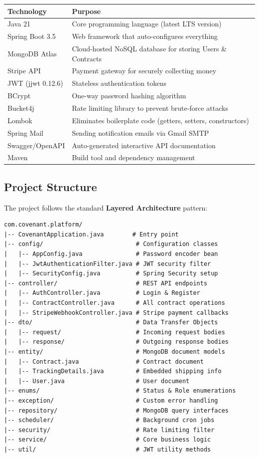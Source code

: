 \documentclass[11pt, a4paper]{article}
\begin{document}
\begin{longtable}{@{}lp{10cm}@{}}
\toprule
\textbf{Technology} & \textbf{Purpose} \\
\midrule
Java 21 & Core programming language (latest LTS version) \\
Spring Boot 3.5 & Web framework that auto-configures everything \\
MongoDB Atlas & Cloud-hosted NoSQL database for storing Users \& Contracts \\
Stripe API & Payment gateway for securely collecting money \\
JWT (jjwt 0.12.6) & Stateless authentication tokens \\
BCrypt & One-way password hashing algorithm \\
Bucket4j & Rate limiting library to prevent brute-force attacks \\
Lombok & Eliminates boilerplate code (getters, setters, constructors) \\
Spring Mail & Sending notification emails via Gmail SMTP \\
Swagger/OpenAPI & Auto-generated interactive API documentation \\
Maven & Build tool and dependency management \\
\bottomrule
\end{longtable}

\subsection{Project Structure}

The project follows the standard \textbf{Layered Architecture} pattern:

\begin{lstlisting}[style=yamlstyle, title={Directory Structure}]
com.covenant.platform/
|-- CovenantApplication.java        # Entry point
|-- config/                          # Configuration classes
|   |-- AppConfig.java               # Password encoder bean
|   |-- JwtAuthenticationFilter.java # JWT security filter
|   |-- SecurityConfig.java          # Spring Security setup
|-- controller/                      # REST API endpoints
|   |-- AuthController.java          # Login & Register
|   |-- ContractController.java      # All contract operations
|   |-- StripeWebhookController.java # Stripe payment callbacks
|-- dto/                             # Data Transfer Objects
|   |-- request/                     # Incoming request bodies
|   |-- response/                    # Outgoing response bodies
|-- entity/                          # MongoDB document models
|   |-- Contract.java                # Contract document
|   |-- TrackingDetails.java         # Embedded shipping info
|   |-- User.java                    # User document
|-- enums/                           # Status & Role enumerations
|-- exception/                       # Custom error handling
|-- repository/                      # MongoDB query interfaces
|-- scheduler/                       # Background cron jobs
|-- security/                        # Rate limiting filter
|-- service/                         # Core business logic
|-- util/                            # JWT utility methods
\end{lstlisting}
\end{document}
